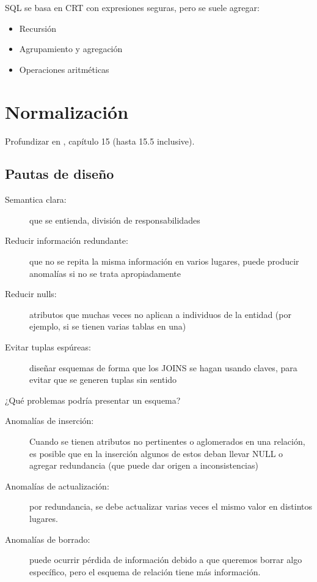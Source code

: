 SQL se basa en CRT con expresiones seguras, pero se suele agregar:

\begin{itemize}
	\item Recursión
	\item Agrupamiento y agregación
	\item Operaciones aritméticas
\end{itemize}

\section{Normalización}

Profundizar en \cite{elmasri2015}, capítulo 15 (hasta 15.5 inclusive).

\subsection{Pautas de diseño}

\begin{description}
	\item[Semantica clara:] que se entienda, división de responsabilidades
	\item[Reducir información redundante:] que no se repita la misma información en varios lugares, puede producir anomalías si no se trata apropiadamente
	\item[Reducir nulls:] atributos que muchas veces no aplican a individuos de la entidad (por ejemplo, si se tienen varias tablas en una)
	\item[Evitar tuplas espúreas:] diseñar esquemas de forma que los JOINS se hagan usando claves, para evitar que se generen tuplas sin sentido
\end{description}

¿Qué problemas podría presentar un esquema?

\begin{description}
	\item[Anomalías de inserción:] Cuando se tienen atributos no pertinentes o aglomerados en una relación, es posible que en la inserción algunos de estos deban llevar NULL o agregar redundancia (que puede dar origen a inconsistencias)
	\item[Anomalías de actualización:] por redundancia, se debe actualizar varias veces el mismo valor en distintos lugares.
	\item[Anomalías de borrado:] puede ocurrir pérdida de información debido a que queremos borrar algo específico, pero el esquema de relación tiene más información.
\end{description}

